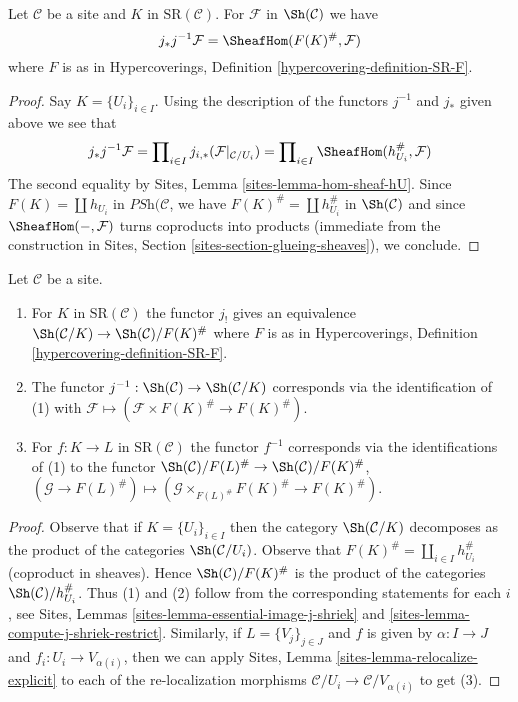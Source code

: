 \begin{lemma}
\label{lemma-push-pull-localization}
Let $\mathcal{C}$ be a site and $K$ in $\text{SR}(\mathcal{C})$.
For $\mathcal{F}$ in $\Sh(\mathcal{C})$ we have
$$
j_*j^{-1}\mathcal{F} = \SheafHom(F(K)^\#, \mathcal{F})
$$
where $F$ is as in
Hypercoverings, Definition \ref{hypercovering-definition-SR-F}.
\end{lemma}

\begin{proof}
Say $K = \{U_i\}_{i \in I}$.
Using the description of the functors $j^{-1}$ and $j_*$
given above we see that
$$
j_*j^{-1}\mathcal{F} =
\prod\nolimits_{i \in I} j_{i, *}(\mathcal{F}|_{\mathcal{C}/U_i}) =
\prod\nolimits_{i \in I} \SheafHom(h_{U_i}^\#, \mathcal{F})
$$
The second equality by Sites, Lemma \ref{sites-lemma-hom-sheaf-hU}.
Since $F(K) = \coprod h_{U_i}$ in $\textit{PSh}(\mathcal{C}$,
we have $F(K)^\# = \coprod h_{U_i}^\#$ in $\Sh(\mathcal{C})$
and since $\SheafHom(-, \mathcal{F})$ turns coproducts into
products (immediate from the construction in
Sites, Section \ref{sites-section-glueing-sheaves}), we conclude.
\end{proof}

\begin{lemma}
\label{lemma-localize-compare}
Let $\mathcal{C}$ be a site.
\begin{enumerate}
\item For $K$ in $\text{SR}(\mathcal{C})$ the functor $j_!$
gives an equivalence $\Sh(\mathcal{C}/K) \to \Sh(\mathcal{C})/F(K)^\#$
where $F$ is as in
Hypercoverings, Definition \ref{hypercovering-definition-SR-F}.
\item The functor $j^{-1} : \Sh(\mathcal{C}) \to \Sh(\mathcal{C}/K)$
corresponds via the identification of (1) with
$\mathcal{F} \mapsto (\mathcal{F} \times F(K)^\# \to F(K)^\#)$.
\item For $f : K \to L$ in $\text{SR}(\mathcal{C})$ the functor
$f^{-1}$ corresponds via the identifications of (1) to the functor
$\Sh(\mathcal{C})/F(L)^\# \to \Sh(\mathcal{C})/F(K)^\#$,
$(\mathcal{G} \to F(L)^\#) \mapsto
(\mathcal{G} \times_{F(L)^\#} F(K)^\# \to F(K)^\#)$.
\end{enumerate}
\end{lemma}

\begin{proof}
Observe that if $K = \{U_i\}_{i \in I}$ then the category
$\Sh(\mathcal{C}/K)$ decomposes as the product of the categories
$\Sh(\mathcal{C}/U_i)$. Observe that
$F(K)^\# = \coprod_{i \in I} h_{U_i}^\#$ (coproduct in sheaves).
Hence $\Sh(\mathcal{C})/F(K)^\#$ is the product of the
categories $\Sh(\mathcal{C})/h_{U_i}^\#$.
Thus (1) and (2) follow from the corresponding
statements for each $i$, see
Sites, Lemmas \ref{sites-lemma-essential-image-j-shriek} and
\ref{sites-lemma-compute-j-shriek-restrict}.
Similarly, if $L = \{V_j\}_{j \in J}$ and $f$ is given
by $\alpha : I \to J$ and $f_i : U_i \to V_{\alpha(i)}$,
then we can apply
Sites, Lemma \ref{sites-lemma-relocalize-explicit}
to each of the re-localization morphisms
$\mathcal{C}/U_i \to \mathcal{C}/V_{\alpha(i)}$
to get (3).
\end{proof}

